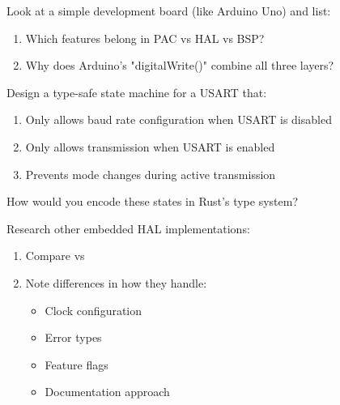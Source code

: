 \begin{exercise}[Easy]
    Look at a simple development board (like Arduino Uno) and list:
    \begin{enumerate}
        \item Which features belong in PAC vs HAL vs BSP?
        \item Why does Arduino's "digitalWrite()" combine all three layers?
    \end{enumerate}
\end{exercise}

\begin{exercise}[Medium]
    Design a type-safe state machine for a USART that:
    \begin{enumerate}
        \item Only allows baud rate configuration when USART is disabled
        \item Only allows transmission when USART is enabled
        \item Prevents mode changes during active transmission
    \end{enumerate}
    How would you encode these states in Rust's type system?
\end{exercise}

\begin{exercise}[Hard]
    Research other embedded HAL implementations:
    \begin{enumerate}
        \item Compare  vs 
        \item Note differences in how they handle:
            \begin{itemize}
                \item Clock configuration
                \item Error types
                \item Feature flags
                \item Documentation approach
            \end{itemize}
    \end{enumerate}
\end{exercise}
\clearpage
